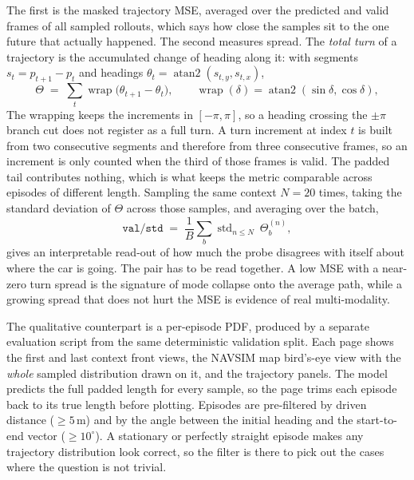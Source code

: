 The first is the masked trajectory MSE, averaged over the predicted and valid
frames of all sampled rollouts, which says how close the samples sit to the one
future that actually happened. The second measures spread. The \emph{total turn}
of a trajectory is the accumulated change of heading along it: with segments
$s_t=p_{t+1}-p_t$ and headings $\theta_t=\operatorname{atan2}(s_{t,y},s_{t,x})$,
\begin{equation}
\Theta \;=\; \sum_{t} \operatorname{wrap}\!\big(\theta_{t+1}-\theta_t\big),
\qquad
\operatorname{wrap}(\delta)=\operatorname{atan2}(\sin\delta,\cos\delta),
\label{eq:total-turn}
\end{equation}
The wrapping keeps the increments in $[-\pi,\pi]$, so a heading crossing the
$\pm\pi$ branch cut does not register as a full turn. A turn increment at index
$t$ is built from two consecutive segments and therefore from three consecutive
frames, so an increment is only counted when the third of those frames is valid.
The padded tail contributes nothing, which is what keeps the metric comparable
across episodes of different length. Sampling the same context $N=20$ times,
taking the standard deviation of $\Theta$ across those samples, and averaging
over the batch,
\begin{equation}
\texttt{val/std} \;=\; \frac{1}{B}\sum_{b} \operatorname{std}_{n\le N}\ \Theta_{b}^{(n)},
\label{eq:turn-std}
\end{equation}
gives an interpretable read-out of how much the probe disagrees with itself about
where the car is going. The pair has to be read together. A low MSE with a
near-zero turn spread is the signature of mode collapse onto the average path,
while a growing spread that does not hurt the MSE is evidence of real
multi-modality.

The qualitative counterpart is a per-episode PDF, produced by a separate
evaluation script from the same deterministic validation split. Each page shows
the first and last context front views, the NAVSIM map bird's-eye view with the
\emph{whole} sampled distribution drawn on it, and the trajectory panels. The
model predicts the full padded length for every sample, so the page trims each
episode back to its true length before plotting. Episodes are pre-filtered by
driven distance ($\ge 5$\,m) and by the angle between the initial heading and the
start-to-end vector ($\ge 10^\circ$). A stationary or perfectly straight episode
makes any trajectory distribution look correct, so the filter is there to pick
out the cases where the question is not trivial.

